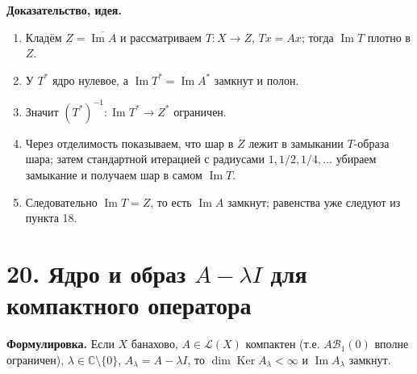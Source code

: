 \documentclass[10pt,a4paper]{article}
\newcommand{\X}{X}
\newcommand{\Ker}{\operatorname{Ker}}
\begin{document}
	\textbf{Доказательство, идея.}
	\begin{enumerate}
		\item Кладём $Z=\overline{\operatorname{Im}A}$ и рассматриваем $T:\X\to Z$, $Tx=Ax$; тогда $\operatorname{Im}T$ плотно в $Z$.
		\item У $T^\ast$ ядро нулевое, а $\operatorname{Im}T^\ast=\operatorname{Im}A^\ast$ замкнут и полон.
		\item Значит $(T^\ast)^{-1}:\operatorname{Im}T^\ast\to Z^\ast$ ограничен.
		\item Через отделимость показываем, что шар в $Z$ лежит в замыкании $T$-образа шара; затем стандартной итерацией с радиусами $1,1/2,1/4,\dots$ убираем замыкание и получаем шар в самом $\operatorname{Im}T$.
		\item Следовательно $\operatorname{Im}T=Z$, то есть $\operatorname{Im}A$ замкнут; равенства уже следуют из пункта 18.
	\end{enumerate}

	\section*{20. Ядро и образ $A-\lambda I$ для компактного оператора}
	\textbf{Формулировка.} Если $\X$ банахово, $A \in \mathcal{L}(\X)$ компактен (т.е. $A\mathcal{B}_1(0)$ вполне ограничен), $\lambda\in\mathbb{C}\setminus\{0\}$, $A_\lambda=A-\lambda I$, то $\dim\Ker A_\lambda<\infty$ и $\operatorname{Im}A_\lambda$ замкнут.
\end{document}
